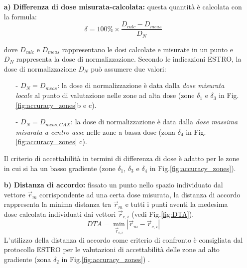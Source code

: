 \begin{enumerate}

\item[\textbf{a)}] \textbf{Differenza di dose misurata-calcolata:} questa quantità è calcolata con la formula:
\begin{equation}
\delta = 100\% \times \frac{D_{calc} - D_{meas}}{D_{N}}
\end{equation}

dove $D_{calc}$ e $D_{meas}$ rappresentano le dosi calcolate e misurate in un punto e $D_N$ rappresenta la dose di normalizzazione. Secondo le indicazioni ESTRO, la dose di normalizzazione $D_N$ può assumere due valori:
\begin{itemize}
\item[-] $D_N=D_{meas}$: la dose di normalizzazione è data dalla \textit{dose misurata locale} al punto di valutazione nelle zone ad alta dose (zone $\delta_1$ e $\delta_3$ in Fig.\ref{fig:accuracy_zones}b e c).
\item[-] $D_N=D_{meas,CAX}$: la dose di normalizzazione è data dalla \textit{dose massima misurata a centro asse} nelle zone a bassa dose (zona $\delta_4$ in Fig.\ref{fig:accuracy_zones} c).
\end{itemize}

Il criterio di accettabilità in termini di differenza di dose è adatto per le zone in cui si ha un basso gradiente (zone $\delta_1$, $\delta_3$ e $\delta_4$ in Fig.\ref{fig:accuracy_zones}).

\item[\textbf{b)}] \textbf{Distanza di accordo:} fissato un punto nello spazio individuato dal vettore $\vec{r}_{m}$ corrispondente ad una certa dose misurata, la distanza di accordo rappresenta la minima distanza tra $\vec{r}_{m}$ e tutti i punti aventi la medesima dose calcolata individuati dai vettori $\vec{r}_{c,i}$ (vedi Fig.\ref{fig:DTA}).
\begin{equation}
DTA = \min_{\vec{r}_{c,i}} \left|\vec{r}_{m} - \vec{r}_{c,i}\right|
\end{equation}
L'utilizzo della distanza di accordo come criterio di confronto è consigliata dal protocollo ESTRO per le valutazioni di accettabilità delle zone ad alto gradiente  (zona $\delta_2$ in Fig.\ref{fig:accuracy_zones}) .
\end{enumerate}

